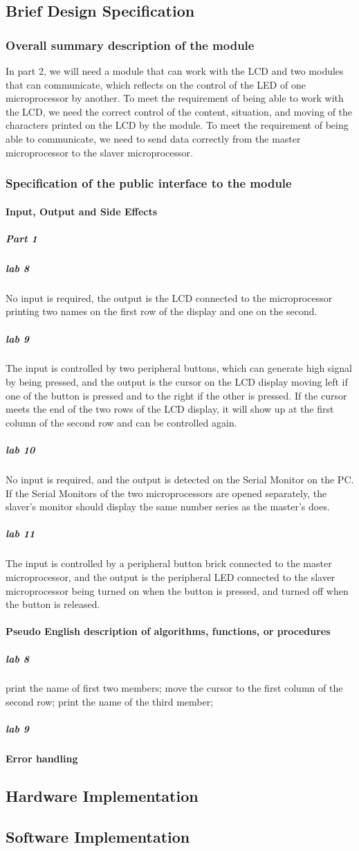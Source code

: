 \subsection{Brief Design Specification}
\subsubsection{Overall summary description of the module}
In part 2, we will need a module that can work with the LCD and two modules that can communicate, which reflects on the control of the LED of one microprocessor by another. To meet the requirement of being able to work with the LCD, we need the correct control of the content, situation, and moving of the characters printed on the LCD by the module. To meet the requirement of being able to communicate, we need to send data correctly from the master microprocessor to the slaver microprocessor.
\subsubsection{Specification of the public interface to the module}

\paragraph{Input, Output and Side Effects}
\subparagraph{Part 1}
\subparagraph{lab 8} 
No input is required, the output is the LCD connected to the microprocessor printing two names on the first row of the display and one on the second.
\subparagraph{lab 9}
The input is controlled by two peripheral buttons, which can generate high signal by being pressed, and the output is the cursor on the LCD display moving left if one of the button is pressed and to the right if the other is pressed. If the cursor meets the end of the two rows of the LCD display, it will show up at the first column of the second row and can be controlled again.
\subparagraph{lab 10}
No input is required, and the output is detected on the Serial Monitor on the PC. If the Serial Monitors of the two microprocessors are opened separately, the slaver's monitor should display the same number series as the master's does. 
\subparagraph{lab 11}
The input is controlled by a peripheral button brick connected to the master microprocessor, and the output is the peripheral LED connected to the slaver microprocessor being turned on when the button is pressed, and turned off when the button is released.
\paragraph{Pseudo English description of algorithms, functions, or procedures}
\subparagraph{lab 8}
print the name of first two members;
move the cursor to the first column of the second row;
print the name of the third member;
\subparagraph{lab 9}

\paragraph{Error handling}
\subsection{Hardware Implementation}
\subsection{Software Implementation}
